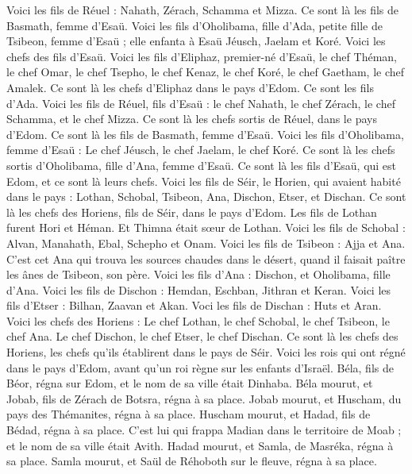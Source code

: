\begin{multicols}{2}
Voici les fils de Réuel : Nahath, Zérach, Schamma et Mizza. Ce sont là les fils de Basmath, femme d'Esaü.
Voici les fils d'Oholibama, fille d’Ada, petite fille de Tsibeon, femme d'Esaü ; elle enfanta à Esaü Jéusch, Jaelam et Koré.
Voici les chefs des fils d'Esaü. Voici les fils d'Eliphaz, premier-né d'Esaü, le chef Théman, le chef Omar, le chef Tsepho, le chef Kenaz,
le chef Koré, le chef Gaetham, le chef Amalek. Ce sont là les chefs d'Eliphaz dans le  pays d'Edom. Ce sont les fils d’Ada.
Voici les fils de Réuel, fils d'Esaü : le chef Nahath, le chef Zérach, le chef Schamma, et le chef Mizza. Ce sont là les chefs sortis de Réuel, dans le pays d'Edom.  Ce sont là les fils de Basmath, femme d'Esaü.
Voici les fils d'Oholibama, femme d'Esaü : Le chef Jéusch, le chef Jaelam, le chef Koré. Ce sont là les chefs sortis d'Oholibama, fille d’Ana, femme d'Esaü.
Ce sont là les fils d'Esaü, qui est Edom, et ce sont là leurs chefs.
Voici les fils de Séir, le Horien, qui avaient habité dans le pays : Lothan, Schobal, Tsibeon, Ana,
Dischon, Etser, et Dischan. Ce sont là les chefs des Horiens, fils de Séir, dans le pays d'Edom.
Les fils de Lothan furent Hori et Héman.  Et Thimna était sœur de Lothan.
Voici les fils de Schobal : Alvan, Manahath, Ebal, Schepho et Onam.
Voici les fils de Tsibeon : Ajja et Ana. C’est cet Ana qui trouva les sources chaudes dans le désert, quand il faisait paître les ânes de Tsibeon, son père.
Voici les fils d’Ana : Dischon, et Oholibama, fille d’Ana.
Voici les fils de Dischon : Hemdan, Eschban, Jithran et Keran.
Voici les fils d'Etser : Bilhan, Zaavan et Akan.
Voci les fils de Dischan : Huts et Aran.
Voici les chefs des Horiens : Le chef Lothan, le chef Schobal, le chef Tsibeon, le chef Ana.
Le chef Dischon, le chef Etser, le chef Dischan. Ce sont là les chefs des Horiens, les chefs qu’ils établirent dans le pays de Séir.
Voici les rois qui ont régné dans le pays d'Edom, avant qu’un roi règne sur les enfants d'Israël.
Béla, fils de Béor, régna sur Edom, et le nom de sa ville était Dinhaba.
Béla mourut, et Jobab, fils de Zérach de Botsra, régna à sa place.
Jobab mourut, et Huscham, du pays des Thémanites, régna à sa place.
Huscham mourut, et Hadad, fils de Bédad, régna à sa place. C’est lui qui frappa Madian dans le territoire de Moab ; et le nom de sa ville était Avith.
Hadad mourut, et Samla, de Masréka, régna à sa place.
Samla mourut, et Saül de Réhoboth sur le fleuve, régna à sa place.

\end{multicols}
